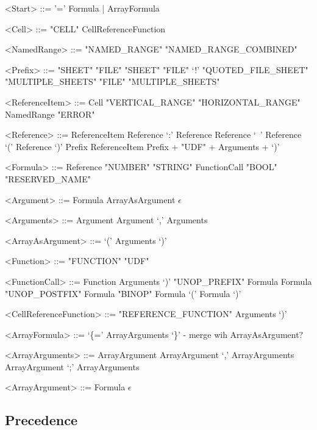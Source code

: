 \documentclass[conference]{IEEEtran}
\begin{document}
\begin{grammar}
<Start> ::= '=' Formula | ArrayFormula


%
%
%
%

<Cell> ::= "CELL"
	  \alt CellReferenceFunction


<NamedRange> ::= "NAMED_RANGE"
            \alt "NAMED_RANGE_COMBINED"

<Prefix> ::= "SHEET"
	\alt "FILE" "SHEET"
	\alt "FILE" `!'
	\alt "QUOTED_FILE_SHEET"
	\alt "MULTIPLE_SHEETS"
	\alt "FILE" "MULTIPLE_SHEETS"

<ReferenceItem> ::= Cell
	\alt "VERTICAL_RANGE"
	\alt "HORIZONTAL_RANGE"
	\alt NamedRange
	\alt "ERROR" 

<Reference> ::= ReferenceItem
	\alt Reference `:' Reference
	\alt Reference `\ ' Reference
	\alt `(' Reference `)'
	\alt Prefix ReferenceItem
              \alt Prefix + "UDF" + Arguments + `)'
              
<Formula> ::= Reference
         \alt "NUMBER"
         \alt "STRING"
         \alt FunctionCall
         \alt "BOOL"
         \alt "RESERVED_NAME"

<Argument> ::= Formula
\alt ArrayAsArgument
\alt $\epsilon$

<Arguments> ::= Argument
\alt Argument `,' Arguments

<ArrayAsArgument> ::= `(' Arguments `)'

<Function> ::= "FUNCTION"
	\alt "UDF"

<FunctionCall> ::= Function Arguments `)'
\alt "UNOP_PREFIX" Formula
\alt Formula "UNOP_POSTFIX"
\alt Formula "BINOP" Formula
\alt `(' Formula `)'

<CellReferenceFunction> ::= "REFERENCE_FUNCTION" Arguments `)'

<ArrayFormula> ::= `\{=' ArrayArguments `\}' - merge wih ArrayAsArgument?

<ArrayArguments> ::= ArrayArgument
 \alt ArrayArgument `,' ArrayArguments
 \alt ArrayArgument `;' ArrayArguments
 
<ArrayArgument> ::= Formula
 \alt $\epsilon$


\end{grammar}

\subsection{Precedence}
\end{document}
